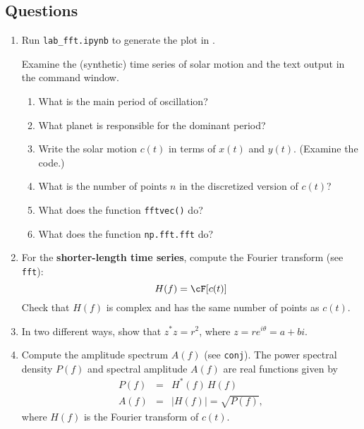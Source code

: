 \documentclass[11pt,titlepage,fleqn]{article}
\begin{document}
\begin{spacing}{2.0}

\section*{Questions}

\begin{enumerate}

\item Run \verb+lab_fft.ipynb+ to generate the plot in .

Examine the (synthetic) time series of solar motion and the text output in the command window.
%
\begin{enumerate}
\item What is the main period of oscillation?
\item What planet is responsible for the dominant period?
\item Write the solar motion $c(t)$ in terms of $x(t)$ and $y(t)$. (Examine the code.)
\item What is the number of points $n$ in the discretized version of $c(t)$? 
\item What does the function \verb+fftvec()+ do?
\item What does the function \verb+np.fft.fft+ do?
\end{enumerate}


\item For the {\bf shorter-length time series}, compute the Fourier transform (see \verb+fft+):
%
\begin{equation*}
H(f) = \cF[c(t)]
\end{equation*}
%
Check that $H(f)$ is complex and has the same number of points as $c(t)$.


\item In two different ways, show that $z^{*}z = r^2$, where $z = r e^{i\theta} = a + bi$.


\item  Compute the amplitude spectrum $A(f)$ (see \verb+conj+).
The power spectral density $P(f)$ and spectral amplitude $A(f)$ are real functions given by
%
\begin{eqnarray*}
P(f) &=& H^{*}(f)\,H(f)
\\
A(f) &=& |H(f)| = \sqrt{P(f)},
\end{eqnarray*}
%
where $H(f)$ is the Fourier transform of $c(t)$.


\end{enumerate}
\end{spacing}
\end{document}
